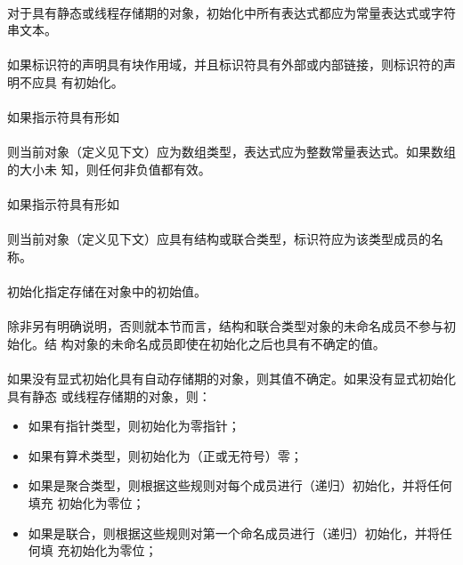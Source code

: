 \paragraph{}
对于具有静态或线程存储期的对象，初始化中所有表达式都应为常量表达式或字符串文本。

\paragraph{}
如果标识符的声明具有块作用域，并且标识符具有外部或内部链接，则标识符的声明不应具
有初始化。

\paragraph{}
如果指示符具有形如                                                            \\
\mbox{\hspace{4em}\tm{[}  \tm{]}}                     \\
则当前对象（定义见下文）应为数组类型，表达式应为整数常量表达式。如果数组的大小未
知，则任何非负值都有效。

\paragraph{}
如果指示符具有形如                                                            \\
\mbox{\hspace{4em} }                                     \\
则当前对象（定义见下文）应具有结构或联合类型，标识符应为该类型成员的名称。

\semantic
\paragraph{}
初始化指定存储在对象中的初始值。

\paragraph{}
除非另有明确说明，否则就本节而言，结构和联合类型对象的未命名成员不参与初始化。结
构对象的未命名成员即使在初始化之后也具有不确定的值。

\paragraph{}
如果没有显式初始化具有自动存储期的对象，则其值不确定。如果没有显式初始化具有静态
或线程存储期的对象，则：
\begin{itemize}
  \item{如果有指针类型，则初始化为零指针；}
  \item{如果有算术类型，则初始化为（正或无符号）零；}
  \item{如果是聚合类型，则根据这些规则对每个成员进行（递归）初始化，并将任何填充
    初始化为零位；}
  \item{如果是联合，则根据这些规则对第一个命名成员进行（递归）初始化，并将任何填
    充初始化为零位；}
\end{itemize}


